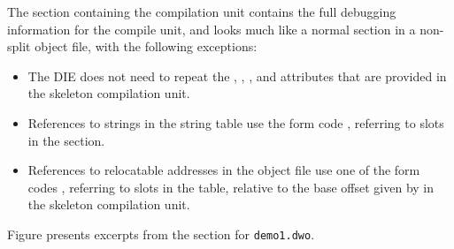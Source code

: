 The \dotdebuginfodwo{} section containing the compilation unit
contains the full debugging information for the compile unit, and
looks much like a normal \dotdebuginfo{} section in a non-split
object file, with the following exceptions:
\begin{itemize}
\item The \DWTAGcompileunit{} DIE does not need to repeat the
\DWATranges, \DWATlowpc, \DWAThighpc, and
\DWATstmtlist{} attributes that are provided in the skeleton
compilation unit.

\item References to strings in the string table use the 
form code \DWFORMstrxXNor, referring to slots in the
\dotdebugstroffsetsdwo{} section.

\item References to relocatable addresses in the object file use
one of the form codes \DWFORMaddrxXNor, referring to slots in the
\dotdebugaddr{} table, relative to the base offset given by
\DWATaddrbase{} in the skeleton compilation unit.
\end{itemize}

\vspace*{1mm}
Figure  presents
excerpts from the \dotdebuginfodwo{} section for \texttt{demo1.dwo}.

